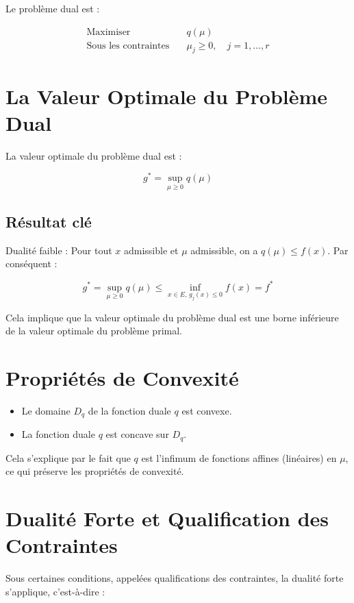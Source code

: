 \documentclass{article}
\begin{document}
Le problème dual est :

\begin{align*}
\text{Maximiser} \quad & q(\mu) \\
\text{Sous les contraintes} \quad & \mu_j \geq 0, \quad j = 1, \dotsc, r
\end{align*}

\section{La Valeur Optimale du Problème Dual}

La valeur optimale du problème dual est :

\[
g^* = \sup_{\mu \geq 0} q(\mu)
\]

\subsection{Résultat clé}

Dualité faible : Pour tout $x$ admissible et $\mu$ admissible, on a $q(\mu) \leq f(x)$. Par conséquent :

\[
g^* = \sup_{\mu \geq 0} q(\mu) \leq \inf_{x \in E, \, g_j(x) \leq 0} f(x) = f^*
\]

Cela implique que la valeur optimale du problème dual est une borne inférieure de la valeur optimale du problème primal.

\section{Propriétés de Convexité}

\begin{itemize}
    \item Le domaine $D_q$ de la fonction duale $q$ est convexe.
    \item La fonction duale $q$ est concave sur $D_q$.
\end{itemize}

Cela s'explique par le fait que $q$ est l'infimum de fonctions affines (linéaires) en $\mu$, ce qui préserve les propriétés de convexité.

\section{Dualité Forte et Qualification des Contraintes}

Sous certaines conditions, appelées qualifications des contraintes, la dualité forte s'applique, c'est-à-dire :
\end{document}
